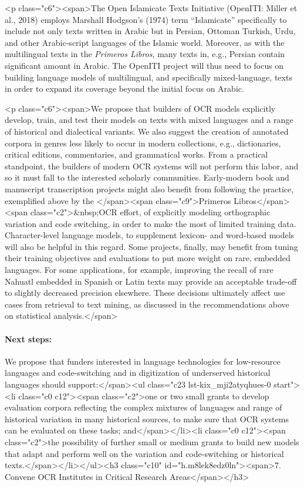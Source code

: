 \documentclass[twoside,11pt]{report}
\begin{document}
<p class="c6"><span>The Open Islamicate Texts Initiative (OpenITI: Miller et al., 2018) employs Marshall Hodgson's (1974) term ``Islamicate'' specifically to include not only texts written in Arabic but in Persian, Ottoman Turkish, Urdu, and other Arabic-script languages of the Islamic world. Moreover, as with the multilingual texts in the \emph{Primeros Libros}, many texts in, e.g., Persian contain significant amount in Arabic. The OpenITI project will thus need to focus on building language models of multilingual, and specifically mixed-language, texts in order to expand its coverage beyond the initial focus on Arabic.

<p class="c6"><span>We propose that builders of OCR models explicitly develop, train, and test their models on texts with mixed languages and a range of historical and dialectical variants. We also suggest the creation of annotated corpora in genres less likely to occur in modern collections, e.g., dictionaries, critical editions, commentaries, and grammatical works. From a practical standpoint, the builders of modern OCR systems will not perform this labor, and so it must fall to the interested scholarly communities. Early-modern book and manuscript transcription projects might also benefit from following the practice, exemplified above by the </span><span class="c9">Primeros Libros</span><span class="c2">&nbsp;OCR effort, of explicitly modeling orthographic variation and code switching, in order to make the most of limited training data. Character-level language models, to supplement lexicon- and word-based models will also be helpful in this regard. Some projects, finally, may benefit from tuning their training objectives and evaluations to put more weight on rare, embedded languages. For some applications, for example, improving the recall of rare Nahuatl embedded in Spanish or Latin texts may provide an acceptable trade-off to slightly decreased precision elsewhere. These decisions ultimately affect use cases from retrieval to text mining, as discussed in the recommendations above on statistical analysis.</span>

\paragraph{Next steps:} We propose that funders interested in language technologies for low-resource languages and code-switching and in digitization of underserved historical languages should support:</span><ul class="c23 lst-kix_mji2atyqhues-0 start"><li class="c0 c12"><span class="c2">one or two small grants to develop evaluation corpora reflecting the complex mixtures of languages and range of historical variation in many historical sources, to make sure that OCR systems can be evaluated on these tasks; and</span></li><li class="c0 c12"><span class="c2">the possibility of further small or medium grants to build new models that adapt and perform well on the variation and code-switching or historical texts.</span></li></ul><h3 class="c10" id="h.m8lek8edz0ln"><span>7. Convene OCR Institutes in Critical Research Areas</span></h3>
\end{document}
